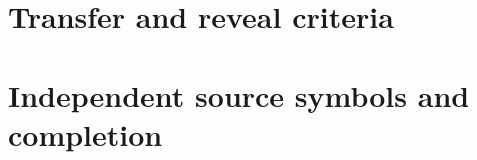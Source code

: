 
\clearpage
\section{Transfer and reveal criteria}
\label{sec:transfer-foundations}



\clearpage
\section{Independent source symbols and completion}
\label{sec:product-source-foundations}

